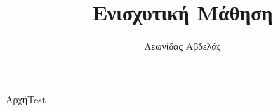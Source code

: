 \documentclass[12pt, letterpaper]{article}
\title{Ενισχυτική Μάθηση}
\author{Λεωνίδας Αβδελάς}
\begin{document}
Αρχή\textlatin{Test}
\end{document}
